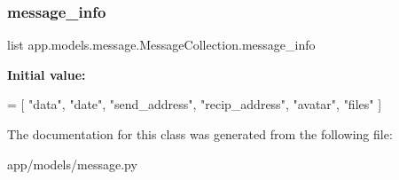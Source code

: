\subsubsection{\texorpdfstring{message\+\_\+info}{message\_info}}
{\footnotesize\ttfamily list app.\+models.\+message.\+Message\+Collection.\+message\+\_\+info\hspace{0.3cm}{\ttfamily [static]}}

{\bfseries Initial value\+:}
\begin{DoxyCode}
=  [
        \textcolor{stringliteral}{"data"},
        \textcolor{stringliteral}{"date"},
        \textcolor{stringliteral}{"send\_address"},
        \textcolor{stringliteral}{"recip\_address"},
        \textcolor{stringliteral}{"avatar"},
        \textcolor{stringliteral}{"files"}
    ]
\end{DoxyCode}


The documentation for this class was generated from the following file\+:\begin{DoxyCompactItemize}
\item 
app/models/message.\+py\end{DoxyCompactItemize}
